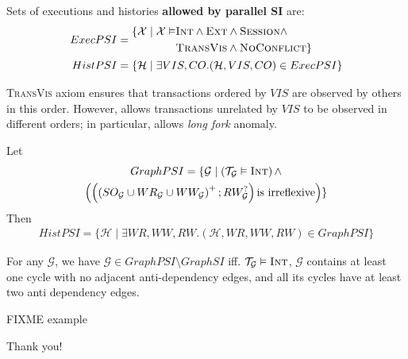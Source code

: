 \documentclass{beamer}
\begin{document}
\begin{frame}
	\begin{definition}
		Sets of executions and histories \textbf{allowed by parallel SI} are:
		$$
		\begin{aligned}
		ExecPSI = {} &
		\begin{aligned}
			\{
				\mathcal{X} \mid
				\mathcal{X} \vDash & \textsc{Int} \wedge \textsc{Ext} \wedge \textsc{Session} \wedge \\
				& \textsc{TransVis} \wedge \textsc{NoConflict}
			\}
		\end{aligned}
		\\
		HistPSI = {} & \{ \mathcal{H} \mid \exists VIS, CO. (\mathcal{H}, VIS, CO) \in ExecPSI \}
		\end{aligned}
		$$
	\end{definition}
	\textsc{TransVis} axiom ensures that transactions ordered by $VIS$ are observed by others in this order. However, allows transactions unrelated by $VIS$ to be observed in different orders; in particular, allows \textit{long fork} anomaly.
\end{frame}

\begin{frame}
	\begin{theorem}
	Let
		\begin{multline*}
		GraphPSI = \{ \mathcal{G} \mid \left( \mathcal{T}_\mathcal{G} \vDash \textsc{Int} \right) \wedge \\
			\left(
				\left(
					\left(
					SO_\mathcal{G} \cup WR_\mathcal{G} \cup WW_\mathcal{G}
					\right)^+; RW_\mathcal{G}^?
				\right) \text{is irreflexive}
			\right)
		\}
		\end{multline*}
		Then
		\begin{multline*}
		HistPSI = \{ \mathcal{H} \mid  \exists WR,WW,RW.
		 (\mathcal{H}, WR, WW, RW) \in GraphPSI \}
		\end{multline*}
	\end{theorem}
\end{frame}

\begin{frame}
	\begin{theorem}
		For any $\mathcal{G}$, we have $\mathcal{G} \in GraphPSI \setminus GraphSI $ iff. $\mathcal{T}_\mathcal{G} \vDash \textsc{Int}$, $\mathcal{G}$ contains at least one cycle with no adjacent anti-dependency edges, and all its cycles have at least two anti dependency edges.
	\end{theorem}
\end{frame}

\begin{frame}
	FIXME example
\end{frame}

\begin{frame}
	\begin{center}
		Thank you!
	\end{center}
\end{frame}
\end{document}

